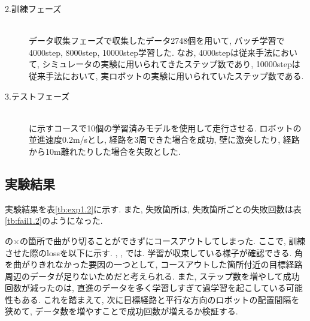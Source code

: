 \begin{description}
  \item[2.訓練フェーズ]\mbox{}\\データ収集フェーズで収集したデータ2748個を用いて, バッチ学習で4000step, 8000step, 10000step学習した. なお, 4000stepは従来手法において, シミュレータの実験に用いられてきたステップ数であり, 10000stepは従来手法において, 実ロボットの実験に用いられていたステップ数である. 
\end{description}

\begin{description}
  \item[3.テストフェーズ]\mbox{}\\ に示すコースで10個の学習済みモデルを使用して走行させる. ロボットの並進速度0.2m/sとし, 経路を3周できた場合を成功, 壁に激突したり, 経路から10m離れたりした場合を失敗とした.
\end{description}

\subsection{実験結果}
実験結果を表\ref{tb:exp1.2}に示す. また, 失敗箇所は, 失敗箇所ごとの失敗回数は表\ref{tb:fail1.2}のようになった. 
\par {}の×の箇所で曲がり切ることができずにコースアウトしてしまった. ここで, 訓練させた際のlossを以下に示す. , , では. 学習が収束している様子が確認できる. 角を曲がりきれなかった要因の一つとして, コースアウトした箇所付近の目標経路周辺のデータが足りないためだと考えられる. また, ステップ数を増やして成功回数が減ったのは, 直進のデータを多く学習しすぎて過学習を起こしている可能性もある. これを踏まえて, 次に目標経路と平行な方向のロボットの配置間隔を狭めて, データ数を増やすことで成功回数が増えるか検証する. 



